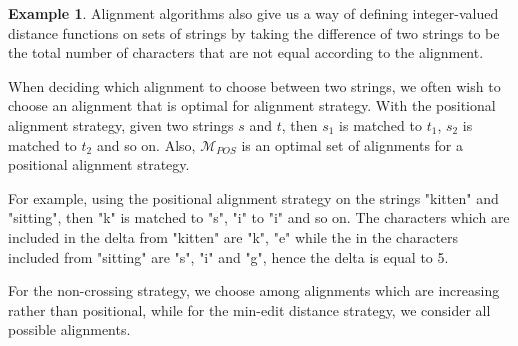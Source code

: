 \documentclass[acmsmall,review,anonymous]{acmart}\settopmatter{printfolios=true,printccs=false,printacmref=false}
\theoremstyle{definition}
\newtheorem{example}{Example}
\begin{document}
\begin{example}
Alignment algorithms also give us a way of defining integer-valued distance
functions on sets of strings by taking the difference of two strings to be the
total number of characters that are not equal according to the alignment.

When deciding which alignment to choose between two strings, we often wish to
choose an alignment that is optimal for alignment strategy. With
the positional alignment strategy, given two strings $s$ and $t$, then $s_1$ is
matched to $t_1$, $s_2$ is matched to $t_2$ and so on.
Also, $\mathcal{M}_{POS}$ is an optimal set of alignments for a positional
alignment strategy.

For example, using the positional alignment strategy on the strings "kitten" and
"sitting", then "k" is matched to "s", "i" to "i" and so on. The characters
which are included in the delta from "kitten" are "k", "e" while the
in the characters included from "sitting" are "s", "i" and "g", hence the delta
is equal to 5.

For the non-crossing strategy, we choose among alignments which are increasing
rather than positional, while for the min-edit distance strategy, we consider
all possible alignments.
\end{example}
\end{document}
